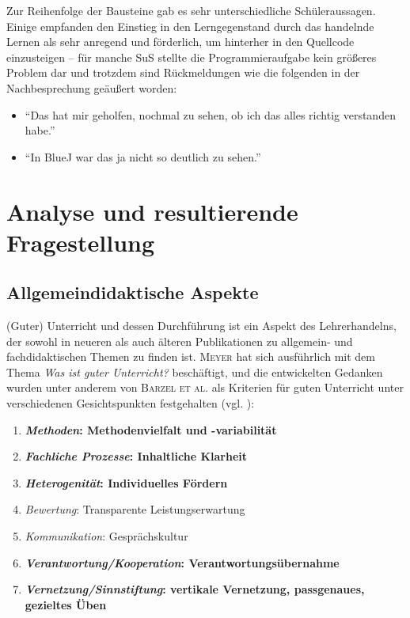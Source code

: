 \documentclass[paper=a4, DIV=13, BCOR=12mm, twoside=on, onecolumn=on, open = any, titlepage =on, parskip =half-, headsepline = on, footsepline = on, chapterprefix = on, sectionprefix = on, appendixprefix = off, fontsize = 11pt, numbers = noenddot, abstract = off]{scrreprt}
\begin{document}
Zur Reihenfolge der Bausteine gab es sehr unterschiedliche Schüleraussagen. Einige empfanden den Einstieg in den Lerngegenstand durch das handelnde Lernen als sehr anregend und förderlich, um hinterher in den Quellcode einzusteigen -- für manche SuS stellte die Programmieraufgabe kein größeres Problem dar und trotzdem sind Rückmeldungen wie die folgenden in der Nachbesprechung geäußert worden:

\singlespacing
\begin{itemize}
\item "`Das hat mir geholfen, nochmal zu sehen, ob ich das alles richtig verstanden habe."'
\item "`In BlueJ war das ja nicht so deutlich zu sehen."'
\end{itemize}
\onehalfspacing


\par \singlespacing
 \section{Analyse und resultierende Fragestellung}
\onehalfspacing

\par \singlespacing
\subsection*{Allgemeindidaktische Aspekte}
\onehalfspacing

(Guter) Unterricht und dessen Durchführung ist ein Aspekt des Lehrerhandelns, der sowohl in neueren als auch älteren Publikationen zu allgemein- und fachdidaktischen Themen zu finden ist. \textsc{Meyer} hat sich ausführlich mit dem Thema \emph{Was ist guter Unterricht?} beschäftigt, und die entwickelten Gedanken wurden unter anderem von \textsc{Barzel et al.} als Kriterien für guten Unterricht unter verschiedenen Gesichtspunkten festgehalten (vgl. \cite[S.24f.]{barzel:16}):
\singlespacing
\begin{enumerate}
\item \textbf{\emph{Methoden}: Methodenvielfalt und -variabilität}
\item \textbf{\emph{Fachliche Prozesse}: Inhaltliche Klarheit}
\item \textbf{\emph{Heterogenität}: Individuelles Fördern}
\item \emph{Bewertung}: Transparente Leistungserwartung
\item \emph{Kommunikation}: Gesprächskultur
\item \textbf{\emph{Verantwortung/Kooperation}: Verantwortungsübernahme}
\item \textbf{\emph{Vernetzung/Sinnstiftung}: vertikale Vernetzung, passgenaues, gezieltes Üben}
\end{enumerate}
\end{document}
